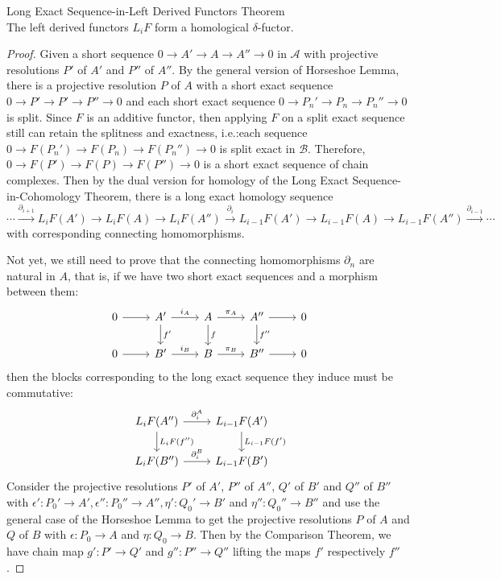 \begin{theorem}{Long Exact Sequence-in-Left Derived Functors Theorem}\\
The left derived functors $L_iF$ form a homological $\delta$-fuctor.
\end{theorem}

\begin{proof}
    Given a short sequence $0\to A'\to A\to A''\to0$ in $\mathcal{A}$ with projective resolutions $P'$ of $A'$ and $P''$ of $A''$. By the general version of Horseshoe Lemma, there is a projective resolution $P$ of $A$ with a short exact sequence $0\to P
    '\to P'\to P''\to0$ and each short exact sequence $0\to P_n' \to P_n\to P_n''\to0$ is split. Since $F$ is an additive functor, then applying $F$ on a split exact sequence still can retain the splitness and exactness, i.e.:each sequence $0\to F(P_n') \to F(P_n) \to F(P_n'') \to 0$ is split exact in $\mathcal{B}$. Therefore, $0\to F(P') \to F(P) \to F(P'')\to0$ is a short exact sequence of chain complexes. Then by the dual version for homology of the Long Exact Sequence-in-Cohomology Theorem, there is a long exact homology sequence
    \[
    \cdots \xrightarrow{\partial_{i+1}} L_iF(A') \to L_iF(A) \to L_iF(A'') \xrightarrow{\partial_i} L_{i-1} F(A') \to L_{i-1} F(A) \to L_{i-1} F(A'') \xrightarrow{\partial_{i-1}} \cdots
    \]
    with corresponding connecting homomorphisms.

    Not yet, we still need to prove that the connecting homomorphisms $\partial_n$ are natural in $A$, that is, if we have two short exact sequences and a morphism between them:
    \[
    \begin{tikzcd}
        0\arrow[r] &A' \arrow[r, "i_A"] \arrow[d, "f'"] &A\arrow[r, "\pi_A"] \arrow[d, "f"] &A'' \arrow[r] \arrow[d, "f''"] &0\\
        0\arrow[r] &B' \arrow[r, "i_B"] &B\arrow[r, "\pi_B"] &B'' \arrow[r] &0
    \end{tikzcd}
    \]
    then the blocks corresponding to the long exact sequence they induce must be commutative:
    \[
    \begin{tikzcd}
        L_i F(A'') \arrow[r, "\partial_i^A"] \arrow[d, "L_iF(f'')"] &L_{i-1}F(A') \arrow[d, "L_{i-1}F(f')"]\\
        L_iF(B'') \arrow[r, "\partial_i^B"] &L_{i-1}F(B')
    \end{tikzcd}
    \]
    Consider the projective resolutions $P'$ of $A'$, $P''$ of $A''$, $Q'$ of $B'$ and $Q''$ of $B''$ with $\epsilon': P_0'\to A', \epsilon'': P_0''\to A'' ,\eta ':Q_0' \to B'$ and $\eta'': Q_0''\to B''$ and use the general case of the Horseshoe Lemma to get the projective resolutions $P$ of $A$ and $Q$ of $B$ with $\epsilon: P_0\to A$ and $\eta: Q_0\to B$. Then by the Comparison Theorem, we have chain map $g': P'\to Q'$ and $g'': P''\to Q''$ lifting the maps $f'$ respectively $f''$.


\end{proof}
